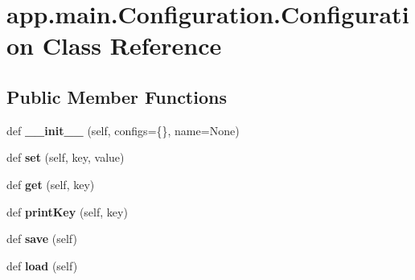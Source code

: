\hypertarget{classapp_1_1main_1_1Configuration_1_1Configuration}{}\section{app.\+main.\+Configuration.\+Configuration Class Reference}
\label{classapp_1_1main_1_1Configuration_1_1Configuration}
\subsection*{Public Member Functions}
\begin{DoxyCompactItemize}
\item 
\mbox{\label{classapp_1_1main_1_1Configuration_1_1Configuration_a90448d977ae02bd04ff9402505023379}} 
def {\bfseries \+\_\+\+\_\+init\+\_\+\+\_\+} (self, configs=\{\}, name=None)
\item 
\mbox{\label{classapp_1_1main_1_1Configuration_1_1Configuration_a75a3867cdeddaeb94aca37c22b8e25a0}} 
def {\bfseries set} (self, key, value)
\item 
\mbox{\label{classapp_1_1main_1_1Configuration_1_1Configuration_a747bdc4ecfdc71dd7772c5e493781b83}} 
def {\bfseries get} (self, key)
\item 
\mbox{\label{classapp_1_1main_1_1Configuration_1_1Configuration_aa265be67d3514a54b09703dffc2114d2}} 
def {\bfseries print\+Key} (self, key)
\item 
\mbox{\label{classapp_1_1main_1_1Configuration_1_1Configuration_a7bf71df11d28da7f7ce62e9c40f014e9}} 
def {\bfseries save} (self)
\item 
\mbox{\label{classapp_1_1main_1_1Configuration_1_1Configuration_a79f4a29c1589c00e513ab6dae52363ec}} 
def {\bfseries load} (self)
\end{DoxyCompactItemize}
